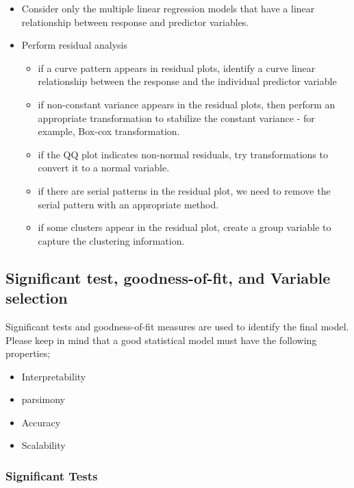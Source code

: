 \documentclass[
]{book}
\providecommand{\tightlist}{%
  \setlength{\itemsep}{0pt}\setlength{\parskip}{0pt}}
\begin{document}
\begin{itemize}
\item
  Consider only the multiple linear regression models that have a linear relationship between response and predictor variables.
\item
  Perform residual analysis

  \begin{itemize}
  \tightlist
  \item
    if a curve pattern appears in residual plots, identify a curve linear relationship between the response and the individual predictor variable
  \item
    if non-constant variance appears in the residual plots, then perform an appropriate transformation to stabilize the constant variance - for example, Box-cox transformation.
  \item
    if the QQ plot indicates non-normal residuals, try transformations to convert it to a normal variable.
  \item
    if there are serial patterns in the residual plot, we need to remove the serial pattern with an appropriate method.
  \item
    if some clusters appear in the residual plot, create a group variable to capture the clustering information.
  \end{itemize}
\end{itemize}

\hypertarget{significant-test-goodness-of-fit-and-variable-selection}{%
\subsection{Significant test, goodness-of-fit, and Variable selection}\label{significant-test-goodness-of-fit-and-variable-selection}}

Significant tests and goodness-of-fit measures are used to identify the final model. Please keep in mind that a good statistical model must have the following properties;

\begin{itemize}
\item
  Interpretability
\item
  parsimony
\item
  Accuracy
\item
  Scalability
\end{itemize}

\hypertarget{significant-tests}{%
\subsubsection{Significant Tests}\label{significant-tests}}
\end{document}
